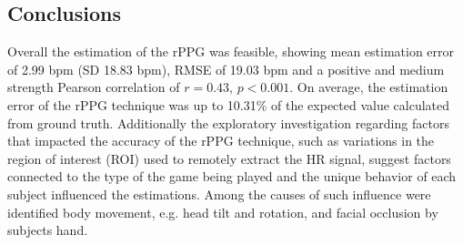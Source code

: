 \subsection{Conclusions}

Overall the estimation of the rPPG was feasible, showing mean estimation error of 2.99 bpm (SD 18.83 bpm), RMSE of 19.03 bpm and a positive and medium strength Pearson correlation of $r=0.43$, $p < 0.001$. On average, the estimation error of the rPPG technique was up to 10.31\% of the expected value calculated from ground truth. Additionally the exploratory investigation regarding factors that impacted the accuracy of the rPPG technique, such as variations in the region of interest (ROI) used to remotely extract the HR signal, suggest factors connected to the type of the game being played and the unique behavior of each subject influenced the estimations. Among the causes of such influence were identified body movement, e.g. head tilt and rotation, and facial occlusion by subjects hand.
